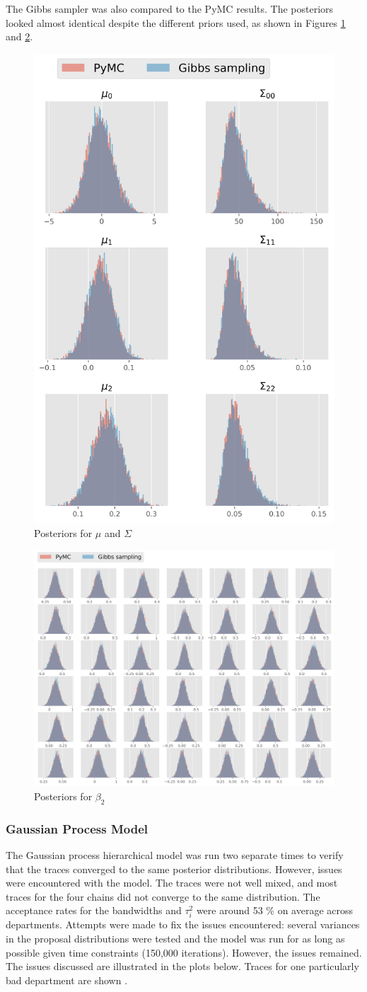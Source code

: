 \documentclass[paper=a4, fontsize=11pt]{scrartcl}
\begin{document}
The Gibbs sampler was also compared to the PyMC results. The posteriors looked almost identical despite the different priors used, as shown in Figures \ref{pymc1} and \ref{pymc2}. 
\begin{figure}[!htb]\label{pymc1}
\centering
\includegraphics[width=.35\textwidth]{project/writeup/compare_gibbs_pymc1.png}
\caption{Posteriors for $\mu$ and $\Sigma$}
\end{figure}
\begin{figure}[!htb]\label{pymc2}
\centering
\includegraphics[width=.85\textwidth]{project/writeup/compare_gibbs_pymc2.png}
\caption{Posteriors for $\beta_2$}
\end{figure}

\newpage


\subsubsection{Gaussian Process Model}
The Gaussian process hierarchical model was run two separate times to verify that the traces converged to the same posterior distributions. However, issues were encountered with the model. The traces were not well mixed, and most traces for the four chains did not converge to the same distribution. The acceptance rates for the bandwidths and $\tau^2_i$ were around 53 \% on average across departments. Attempts were made to fix the issues encountered: several variances in the proposal distributions were tested and the model was run for as long as possible given time constraints (150,000 iterations). However, the issues remained. The issues discussed are illustrated in the plots below.  Traces for one particularly bad department are shown .\\
\end{document}
